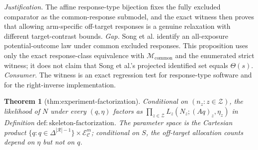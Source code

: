 \documentclass{article}
\newtheorem{theorem}{Theorem}
\begin{document}
\par\smallskip\noindent \textit{Justification.} The affine response-type bijection fixes the fully excluded comparator as the common-response submodel, and the exact witness then proves that allowing arm-specific off-target responses is a genuine relaxation with different target-contrast bounds. \textit{Gap.} Song et al. identify an all-exposure potential-outcome law under common excluded responses.  This proposition uses only the exact response-class equivalence with \(\mathcal M_{\mathrm{common}}\) and the enumerated strict witness; it does not claim that Song et al.'s projected identified set equals \(\Theta(s)\). \textit{Consumer.} The witness is an exact regression test for response-type software and for the right-inverse implementation.

\begin{theorem}[thm:experiment-factorization]\label{thm:experiment-factorization}
Conditional on \((n_z:z\in\mathcal Z)\), the likelihood of \(N\) under every \((q,\eta)\) factors as \(\prod_{z\in\mathcal Z}L_z(N_z;(Aq)_z,\eta_z)\) in Definition \(\mathrm{def:skeleton\mbox{-}factorization}\). The parameter space is the Cartesian product \(\{q:q\in\Delta^{|\mathcal R|-1}\}\times\mathcal E_{\mathcal C}^m\); conditional on \(S\), the off-target allocation counts depend on \(\eta\) but not on \(q\).
\end{theorem}
\end{document}
